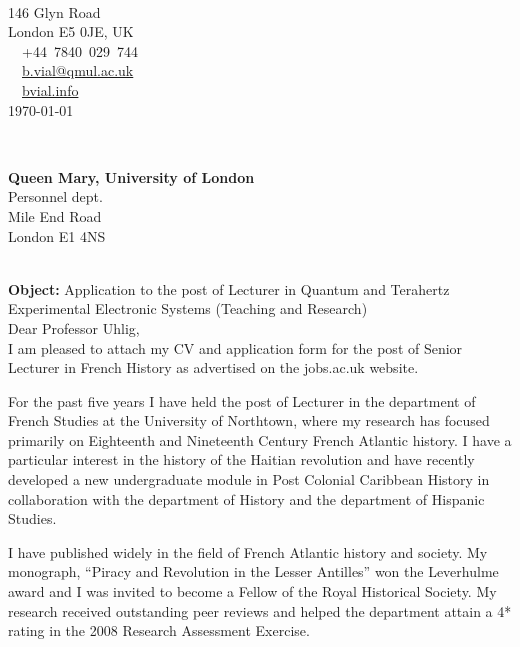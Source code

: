 \documentclass[]{cv} %
\begin{document}
\hfill%
\begin{minipage}[t]{.6\textwidth}
\\
146 Glyn Road\\
London E5 0JE, UK\\
\faPhone~~+44~7840~029~744\\
\faEnvelope~~\href{mailto:b.vial@qmul.ac.uk}{b.vial@qmul.ac.uk}\\
\faUser~~\href{www.bvial.info}{bvial.info}
\\[2em]
\today
\end{minipage}\\[1em]
\begin{minipage}[t]{.4\textwidth}
    \begin{flushleft}
        \textbf{Queen Mary, University of London}\\
Personnel dept.\\
Mile End Road\\
London E1 4NS
    \end{flushleft}
\end{minipage}
\hfill %
\\[2em]
\textbf{Object:} Application to the post of Lecturer in Quantum and Terahertz Experimental Electronic
Systems (Teaching and Research)\\[1.5em]

Dear Professor Uhlig,\\[1em]


I am pleased to attach my CV and application form for the post of Senior
Lecturer in French History as advertised on the jobs.ac.uk website.

For the past five years I have held the post of Lecturer in the department
of French Studies at the University of Northtown, where my research
has focused primarily on Eighteenth and Nineteenth Century French
Atlantic history. I have a particular interest in the history of the Haitian
revolution and have recently developed a new undergraduate module
in Post Colonial Caribbean History in collaboration with the department
of History and the department of Hispanic Studies.

I have published widely in the field of French Atlantic history and society.
My monograph, “Piracy and Revolution in the Lesser Antilles” won the
Leverhulme award and I was invited to become a Fellow of the Royal
Historical Society. My research received outstanding peer reviews
and helped the department attain a 4* rating in the 2008 Research
Assessment Exercise.
\end{document}
